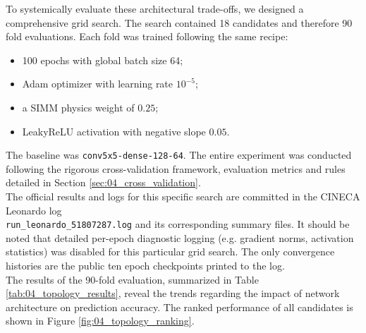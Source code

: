 To systemically evaluate these architectural trade-offs, we designed a comprehensive grid search. The search contained 18 candidates and therefore 90 fold evaluations. Each fold was trained following the same recipe:
\begin{itemize}
    \item[-] 100 epochs with global batch size 64;
    \item[-] Adam optimizer with learning rate $10^{-5}$;
    \item[-] a SIMM physics weight of $0.25$;
    \item[-] LeakyReLU activation with negative slope $0.05$.
\end{itemize}
The baseline was \texttt{conv5x5-dense-128-64}. The entire experiment was conducted following the rigorous cross-validation framework, evaluation metrics and rules detailed in Section \ref{sec:04_cross_validation}.\\

The official results and logs for this specific search are committed in the CINECA Leonardo log \\\texttt{run\_leonardo\_51807287.log} and its corresponding summary files. It should be noted that detailed per-epoch diagnostic logging (e.g. gradient norms, activation statistics) was disabled for this particular grid search. The only convergence histories are the public ten epoch checkpoints printed to the log.\\

The results of the 90-fold evaluation, summarized in Table \ref{tab:04_topology_results}, reveal the trends regarding the impact of network architecture on prediction accuracy. The ranked performance of all candidates is shown in Figure \ref{fig:04_topology_ranking}.\\

